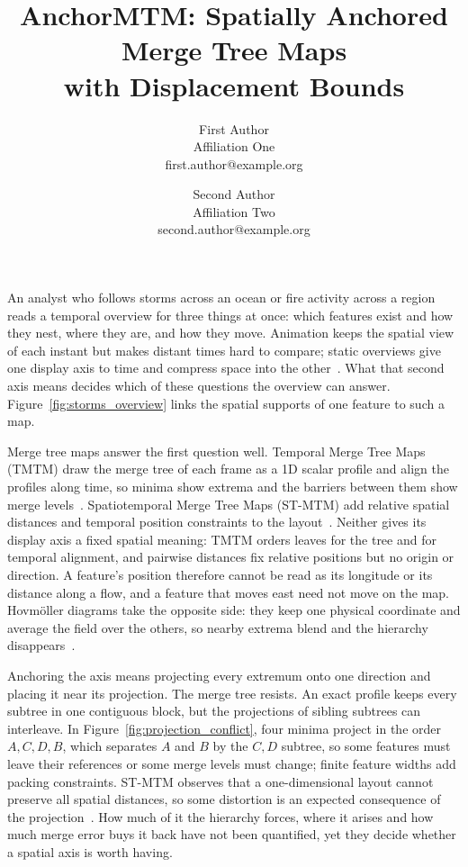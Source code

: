\documentclass[review]{vgtc}
\title{AnchorMTM: Spatially Anchored Merge Tree Maps\\with Displacement Bounds}
\author{}
\author{First Author\\{\normalsize Affiliation One}\\{\small first.author@example.org}%
\and Second Author\\{\normalsize Affiliation Two}\\{\small second.author@example.org}}
\begin{document}
\maketitle
\raggedbottom
\setlength{\emergencystretch}{1.5em}
An analyst who follows storms across an ocean or fire activity across a region reads a temporal overview for three things at once: which features exist and how they nest, where they are, and how they move. Animation keeps the spatial view of each instant but makes distant times hard to compare; static overviews give one display axis to time and compress space into the other~\cite{Tversky:2002:Animation,Robertson:2008:Animation,Bach:2017:STC}. What that second axis means decides which of these questions the overview can answer. Figure~\ref{fig:storms_overview} links the spatial supports of one feature to such a map.

Merge tree maps answer the first question well. Temporal Merge Tree Maps (TMTM) draw the merge tree of each frame as a 1D scalar profile and align the profiles along time, so minima show extrema and the barriers between them show merge levels~\cite{Koepp:2023:TMTM}. Spatiotemporal Merge Tree Maps (ST-MTM) add relative spatial distances and temporal position constraints to the layout~\cite{STMTM:2026}. Neither gives its display axis a fixed spatial meaning: TMTM orders leaves for the tree and for temporal alignment, and pairwise distances fix relative positions but no origin or direction. A feature's position therefore cannot be read as its longitude or its distance along a flow, and a feature that moves east need not move on the map. Hovm\"oller diagrams take the opposite side: they keep one physical coordinate and average the field over the others, so nearby extrema blend and the hierarchy disappears~\cite{Hovmoller:1949}.

Anchoring the axis means projecting every extremum onto one direction and placing it near its projection. The merge tree resists. An exact profile keeps every subtree in one contiguous block, but the projections of sibling subtrees can interleave. In Figure~\ref{fig:projection_conflict}, four minima project in the order $A,C,D,B$, which separates $A$ and $B$ by the $C,D$ subtree, so some features must leave their references or some merge levels must change; finite feature widths add packing constraints. ST-MTM observes that a one-dimensional layout cannot preserve all spatial distances, so some distortion is an expected consequence of the projection~\cite{STMTM:2026}. How much of it the hierarchy forces, where it arises and how much merge error buys it back have not been quantified, yet they decide whether a spatial axis is worth having.
\end{document}
